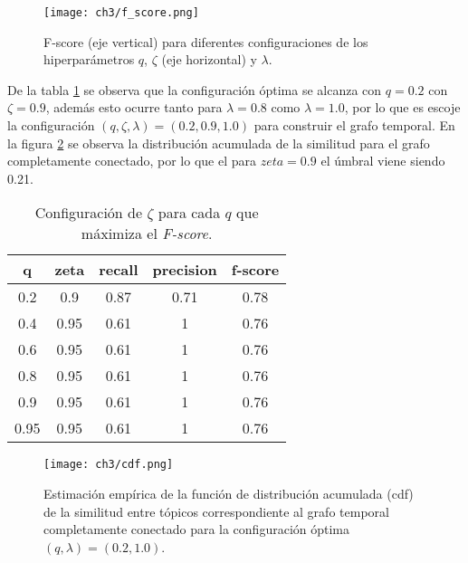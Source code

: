 \documentclass[letterpaper,12pt,oneside]{book} %
\begin{document}
\begin{figure}
    \centering
    \texttt{[image: ch3/f\_score.png]}
    \caption{F-score (eje vertical) para diferentes configuraciones de los hiperparámetros $q$, $\zeta$ (eje horizontal) y $\lambda$.}
    \label{img:f_score}
\end{figure}

De la tabla \ref{table:f_score} se observa que la configuración óptima se alcanza con $q=0.2$ con $\zeta=0.9$, además esto ocurre tanto para $\lambda=0.8$ como $\lambda=1.0$, por lo que es escoje la configuración $(q, \zeta, \lambda) = (0.2, 0.9, 1.0)$ para construir el grafo temporal. En la figura \ref{img:cdf} se observa la distribución acumulada de la similitud para el grafo completamente conectado, por lo que el para $zeta=0.9$ el úmbral viene siendo 0.21.

\begin{table}[H]
    \begin{tabular}{|c|c|c|c|c|}
    \hline
    \textbf{q} & \textbf{zeta} & \textbf{recall} & \textbf{precision} & \textbf{f-score} \\ \hline
    0.2        & 0.9           & 0.87            & 0.71               & 0.78             \\ \hline
    0.4        & 0.95          & 0.61            & 1                  & 0.76             \\ \hline
    0.6        & 0.95          & 0.61            & 1                  & 0.76             \\ \hline
    0.8        & 0.95          & 0.61            & 1                  & 0.76             \\ \hline
    0.9        & 0.95          & 0.61            & 1                  & 0.76             \\ \hline
    0.95       & 0.95          & 0.61            & 1                  & 0.76             \\ \hline
    \end{tabular}
    \caption{Configuración de $\zeta$ para cada $q$ que máximiza el \textit{F-score}.}
    \label{table:f_score}
\end{table}

\begin{figure}
    \centering
    \texttt{[image: ch3/cdf.png]}
    \caption{Estimación empírica de la función de distribución acumulada (cdf) de la similitud entre tópicos correspondiente al grafo temporal completamente conectado para la configuración óptima $(q, \lambda)=(0.2, 1.0)$.}
    \label{img:cdf}
\end{figure}
\end{document}
